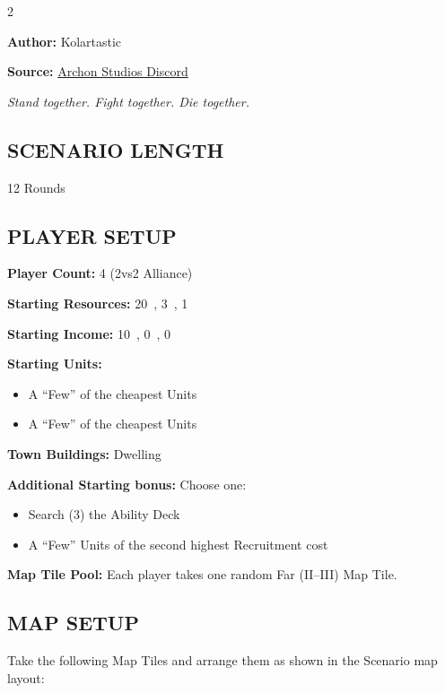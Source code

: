 
\begin{multicols*}{2}

\textbf{Author:} Kolartastic

\textbf{Source:} \href{https://discord.com/channels/740870068178649108/1161571991732625468/threads/1164804609605390386}{Archon Studios Discord}

\textit{Stand together. Fight together. Die together.}  %

\subsection*{\MakeUppercase{Scenario Length}}
12 Rounds

\subsection*{\MakeUppercase{Player Setup}}
\textbf{Player Count:} 4 (2vs2 Alliance)

\textbf{Starting Resources:} 20~, 3~, 1~

\textbf{Starting Income:} 10~, 0~, 0~

\textbf{Starting Units:}

\begin{itemize}
  \item A ``Few'' of the cheapest  Units
  \item A ``Few'' of the cheapest  Units
\end{itemize}

\textbf{Town Buildings:}  Dwelling

\textbf{Additional Starting bonus:}
Choose one:
\begin{itemize}
  \item Search (3) the Ability Deck
  \item A ``Few''  Units of the second highest Recruitment cost
\end{itemize}

\textbf{Map Tile Pool:} Each player takes one random Far (II–III) Map Tile.

\subsection*{\MakeUppercase{Map Setup}}
Take the following Map Tiles and arrange them as shown in the Scenario map layout:


\end{multicols*}
